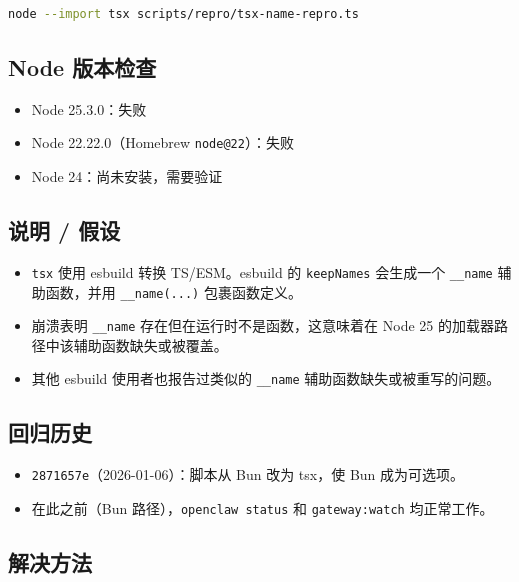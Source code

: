\begin{lstlisting}[language=bash]
node --import tsx scripts/repro/tsx-name-repro.ts
\end{lstlisting}


\subsection{Node 版本检查}


\begin{itemize}
  \item Node 25.3.0：失败
  \item Node 22.22.0（Homebrew \texttt{node@22}）：失败
  \item Node 24：尚未安装，需要验证
\end{itemize}


\subsection{说明 / 假设}


\begin{itemize}
  \item \texttt{tsx} 使用 esbuild 转换 TS/ESM。esbuild 的 \texttt{keepNames} 会生成一个 \texttt{\_\_name} 辅助函数，并用 \texttt{\_\_name(...)} 包裹函数定义。
  \item 崩溃表明 \texttt{\_\_name} 存在但在运行时不是函数，这意味着在 Node 25 的加载器路径中该辅助函数缺失或被覆盖。
  \item 其他 esbuild 使用者也报告过类似的 \texttt{\_\_name} 辅助函数缺失或被重写的问题。
\end{itemize}


\subsection{回归历史}


\begin{itemize}
  \item \texttt{2871657e}（2026-01-06）：脚本从 Bun 改为 tsx，使 Bun 成为可选项。
  \item 在此之前（Bun 路径），\texttt{openclaw status} 和 \texttt{gateway:watch} 均正常工作。
\end{itemize}


\subsection{解决方法}


